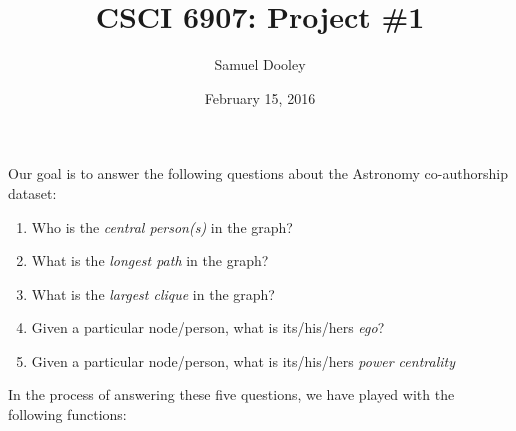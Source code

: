 \documentclass{article}
\title{CSCI 6907: Project \#1}
\author{Samuel Dooley}
\date{February 15, 2016}
\begin{document}
\maketitle

\noindent Our goal is to answer the following questions about the Astronomy co-authorship dataset:
\begin{enumerate}
	\item Who is the \emph{central person(s)} in the graph?
	\item What is the \emph{longest path} in the graph?
	\item What is the \emph{largest clique} in the graph?
	\item Given a particular node/person, what is its/his/hers \emph{ego}? 
	\item Given a particular node/person, what is its/his/hers \emph{power centrality}
\end{enumerate}


\noindent In the process of answering these five questions, we have played with the following functions:
\end{document}

